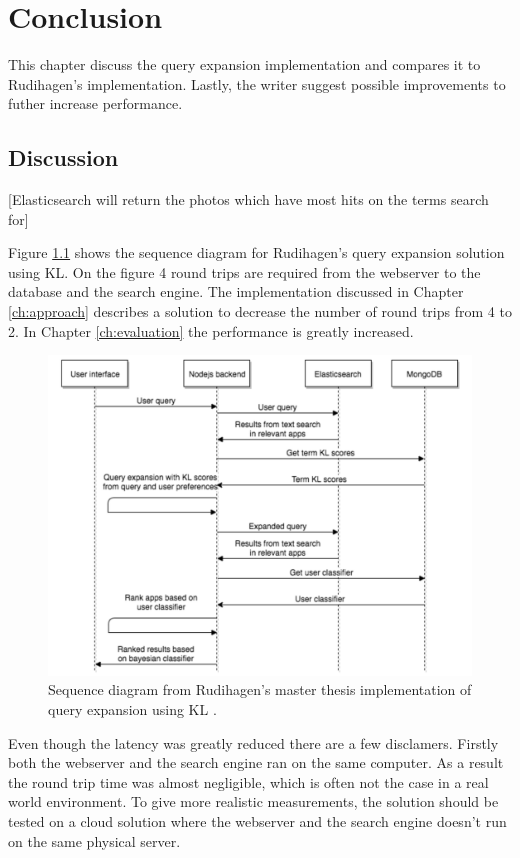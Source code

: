 \chapter{Conclusion}
\label{ch:conclusion}
This chapter discuss the query expansion implementation and compares it to Rudihagen's implementation.
Lastly, the writer suggest possible improvements to futher increase performance.

\section{Discussion}
[Elasticsearch will return the photos which have most hits on the terms search for]

Figure \ref{fig:sequence-diagram-search-master} shows the sequence diagram for Rudihagen's query expansion solution using KL.
On the figure 4 round trips are required from the webserver to the database and the search engine.
The implementation discussed in Chapter \ref{ch:approach} describes a solution to decrease the number of round trips from 4 to 2.
In Chapter \ref{ch:evaluation} the performance is greatly increased.

\begin{figure}[h!]
\centering \includegraphics[width=0.9\linewidth]{img/sequence-diagram-search-master-thesis.png}
\caption{Sequence diagram from Rudihagen's master thesis implementation of query expansion using KL \cite[p. 37]{master-thesis}.}
\label{fig:sequence-diagram-search-master}
\end{figure}

Even though the latency was greatly reduced there are a few disclamers.
Firstly both the webserver and the search engine ran on the same computer.
As a result the round trip time was almost negligible, which is often not the case in a real world environment.
To give more realistic measurements, the solution should be tested on a cloud solution where the webserver and the search engine doesn't run on the same physical server.

